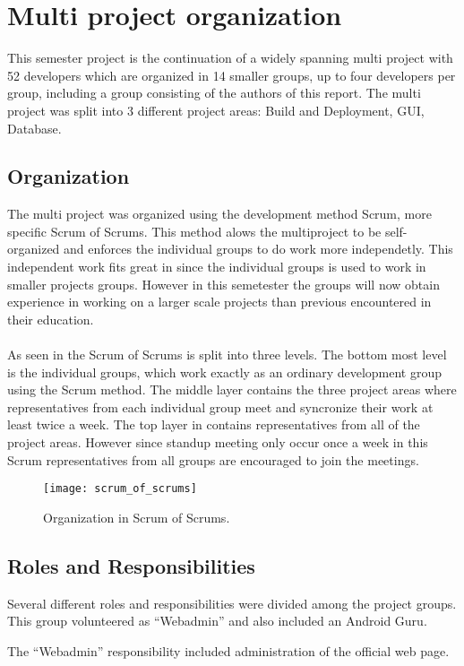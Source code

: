 
\section{Multi project organization}

This semester project is the continuation of a widely spanning multi project with 52 developers which are organized in 14 smaller groups, up to four developers per group, including a group consisting of the authors of this report. The multi project was split into 3 different project areas: Build and Deployment, GUI, Database. 

\subsection{Organization}
The multi project was organized using the development method Scrum\parencite{scrum}, more specific Scrum of Scrums. This method alows the multiproject to be self-organized and enforces the individual groups to do work more independetly. This independent work fits great in since the individual groups is used to work in smaller projects groups. However in this semetester the groups will now obtain experience in working on a larger scale projects than previous encountered in their education. 
\\\\
As seen in  the Scrum of Scrums is split into three levels. The bottom most level is the individual groups, which work exactly as an ordinary development group using the Scrum method. The middle layer contains the three project areas where representatives from each individual group meet and syncronize their work at least twice a week. The top layer in  contains representatives from all of the project areas. However since standup meeting only occur once a week in this Scrum representatives from all groups are encouraged to join the meetings.

\begin{figure}[!htbp]
  \centering
    \texttt{[image: scrum\_of\_scrums]}
    \caption{Organization in Scrum of Scrums.}
    \label{fig:scrum_of_scrums}
\end{figure}



\subsection{Roles and Responsibilities}
Several different roles and responsibilities were divided among the project groups. This group volunteered as ``Webadmin'' and also included an Android Guru.

The ``Webadmin'' responsibility included administration of the official \giraf web page. 